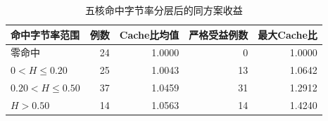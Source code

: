 \begin{table}[htbp]\centering
\caption{五核命中字节率分层后的同方案收益}\label{tab:q3-hit-crosscheck}
\small\begin{tabular}{lrrrr}\toprule
命中字节率范围 & 例数 & Cache比均值 & 严格受益例数 & 最大Cache比 \\ \midrule
零命中 & 24 & 1.0000 & 0 & 1.0000 \\
$0<H\leq0.20$ & 25 & 1.0043 & 13 & 1.0642 \\
$0.20<H\leq0.50$ & 37 & 1.0459 & 31 & 1.2912 \\
$H>0.50$ & 14 & 1.0563 & 14 & 1.4240 \\
\bottomrule\end{tabular}\end{table}
